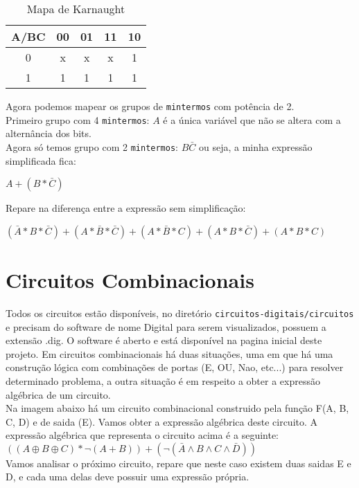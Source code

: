 \documentclass[12pt, onecolumn]{article}
\begin{document}
	\begin{table}[h]
		\centering
		\begin{tabular}{|c|c|c|c|c|}
			\hline
			A/BC & 00 & 01 & 11 & 10 \\ \hline
			0 & x & x & x & 1 \\ \hline
			1 & 1 & 1 & 1 & 1 \\ \hline
		\end{tabular}
		\caption{Mapa de Karnaught}
	\end{table}
	Agora podemos mapear os grupos de \texttt{mintermos} com potência de 2. \\
	\newline
	Primeiro grupo com 4 \texttt{mintermos}: $A$ é a única variável que não se 
	altera com a alternância dos bits. \\
	Agora só temos grupo com 2 \texttt{mintermos}: $B\bar{C}$ ou seja, 
	a minha expressão simplificada fica: 
	\begin{center}
		$A + (B * \bar{C})$
	\end{center}
	Repare na diferença entre a expressão sem simplificação: 
	\begin{center}
		$
		(\bar{A}*B*\bar{C}) + (A*\bar{B}*\bar{C}) +
		(A*\bar{B}*C) + (A*B*\bar{C}) + (A*B*C)
		$
	\end{center}


	\section{\centering Circuitos Combinacionais}

	Todos os circuitos estão disponíveis, no diretório 
	\texttt{circuitos-digitais/circuitos} e precisam do software de nome
	Digital	para serem visualizados, possuem a extensão .dig. 
	O software é aberto e está disponível na pagina inicial deste projeto.
	\newline
	Em circuitos combinacionais há duas situações, uma em que há uma construção
	lógica com combinações de portas (E, OU, Nao, etc...) para resolver 
	determinado problema, a outra situação é em respeito a obter a expressão 
	algébrica de um circuito. \\
	\newline
	Na imagem abaixo há um circuito combinacional construido pela função 
	F(A, B, C, D) e de saida (E). Vamos obter a expressão algébrica deste 
	circuito. 
	A expressão algébrica que representa o circuito acima é a seguinte: \\ 
	$
	((A \oplus B \oplus C) * \lnot(A + B)) + 
	(\lnot(\bar{A} \land B \land C \land \bar{D}))
	$ \\	
	\newline
	Vamos analisar o próximo circuito, repare que neste caso existem duas saidas
	E e D, e cada uma delas deve possuir uma expressão própria. 
	\newline
\end{document}
